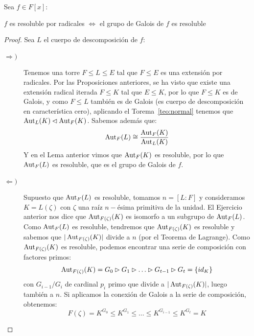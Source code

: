 \begin{teo}
    Sea $f\in F[x]$: 
    \begin{center}
        $f$ es resoluble por radicales $\Longleftrightarrow $ el grupo de Galois de $f$ es resoluble
    \end{center}
    \begin{proof} 
        Sea $L$ el cuerpo de descomposición de $f$:
        \begin{description}
            \item [$\Longrightarrow )$] Tenemos una torre $F\leq L\leq E$ tal que $F\leq E$ es una extensión por radicales. Por las Proposiciones anteriores, se ha visto que existe una extensión radical iterada $F\leq K$ tal que $E\leq K$, por lo que $F\leq K$ es de Galois, y como $F\leq L$ también es de Galois (es cuerpo de descomposición en característica cero), aplicando el Torema~\ref{teo:normal} tenemos que $\operatorname{Aut}_L(K)\lhd \operatorname{Aut}_F(K)$. Sabemos además que:
                \begin{equation*}
                    \operatorname{Aut}_F(L) \cong \frac{\operatorname{Aut}_F(K)}{\operatorname{Aut}_L(K)}
                \end{equation*}
                Y en el Lema anterior vimos que $\operatorname{Aut}_F(K)$ es resoluble, por lo que $\operatorname{Aut}_F(L)$ es resoluble, que es el grupo de Galois de $f$.
            \item [$\Longleftarrow )$] Supuesto que $\operatorname{Aut}_F(L)$ es resoluble, tomamos $n=[L:F]$ y consideramos $K=L(\zeta)$ con $\zeta$ una raíz $n-$ésima primitiva de la unidad. El Ejercicio anterior nos dice que $\operatorname{Aut}_{F(\zeta)}(K)$ es isomorfo a un subgrupo de $\operatorname{Aut}_F(L)$. Como $\operatorname{Aut}_F(L)$ es resoluble, tendremos que $\operatorname{Aut}_{F(\zeta)}(K)$ es resoluble y sabemos que $|\operatorname{Aut}_{F(\zeta)}(K)|$ divide a $n$ (por el Teorema de Lagrange). Como $\operatorname{Aut}_{F(\zeta)}(K)$ es resoluble, podemos encontrar una serie de composición con factores primos:
                \begin{equation*}
                    \operatorname{Aut}_{F(\zeta)}(K) = G_0 \rhd G_1 \rhd \ldots \rhd G_{t-1} \rhd G_t = \{id_K\}
                \end{equation*}
                con $G_{i-1}/G_i$ de cardinal $p_i$ primo que divide a $|\operatorname{Aut}_{F(\zeta)}(K)|$, luego también a $n$. Si aplicamos la conexión de Galois a la serie de composición, obtenemos:
                \begin{equation*}
                    F(\zeta) = K^{G_0} \leq K^{G_1} \leq \ldots \leq K^{G_{i-1}} \leq K^{G_t} = K
                \end{equation*}

\end{description}
\end{proof}
\end{teo}
